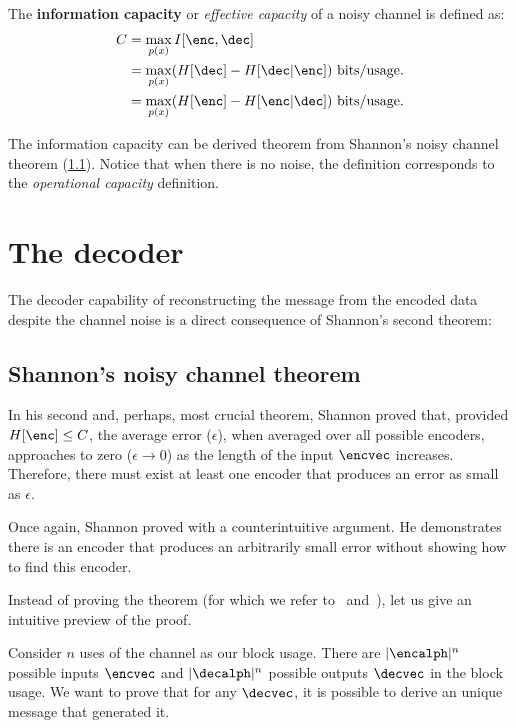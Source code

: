 \begin{definition}
	The \textbf{information capacity} or \emph{effective capacity} of a noisy channel is defined as:
	\begin{align}
		C &= \max_{p(x)} I[\enc,\dec]\\
		&=\max_{p(x)} (H[\dec] - H[\dec|\enc]) \text{ bits/usage.}\\
		&=\max_{p(x)} (H[\enc] - H[\enc|\dec]) \text{ bits/usage}.
	\end{align}
\end{definition}
The information capacity can be derived theorem from Shannon's noisy channel theorem (\ref{noisy_channel_theorem}). Notice that when there is no noise, the definition corresponds to the \emph{operational capacity} definition.

\section{The decoder}
The decoder capability of reconstructing the message from the encoded data despite the channel noise is a direct consequence of Shannon's second theorem:

\subsection{Shannon's noisy channel theorem}\label{noisy_channel_theorem}
In his second and, perhaps, most crucial theorem, Shannon proved that, provided \(H[\enc]\leq C\), the average error (\(\epsilon\)), when averaged over all possible encoders, approaches to zero (\(\epsilon \to 0\)) as the length of the input \(\encvec\) increases. Therefore, there must exist at least one encoder that produces an error as small as \(\epsilon\).

Once again, Shannon proved with a counterintuitive argument. He demonstrates there is an encoder that produces an arbitrarily small error without showing how to find this encoder.

Instead of proving the theorem (for which we refer to~\citeauthor{mackay:2002} and~\citeauthor{cover:2006}), let us give an intuitive preview of the proof.

Consider \(n\) uses of the channel as our block usage. There are \(|\encalph|^n\) possible inputs \(\encvec\) and \(|\decalph|^n\) possible outputs \(\decvec\) in the block usage. We want to prove that for any \(\decvec\), it is possible to derive an unique message that generated it.

